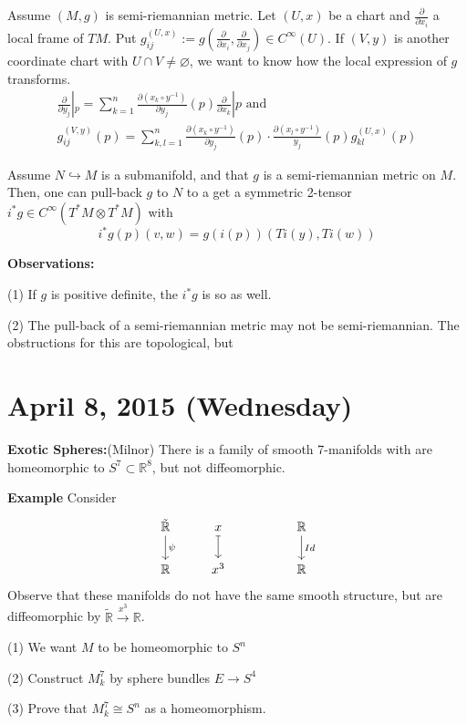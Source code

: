 \documentclass{article}
\begin{document}
Assume $(M,g)$ is semi-riemannian metric. Let $(U,x)$ be a chart and $\frac{\partial}{\partial x_i}$ a local frame of $TM$. Put $g_{ij}^{(U,x)} := g(\frac{\partial}{\partial x_i}, \frac{\partial}{\partial x_j}) \in C^\infty(U)$. If $(V,y)$ is another coordinate chart with $U\cap V \neq \varnothing$, we want to know how the local expression of $g$ transforms.
\begin{align*}
\frac{\partial}{\partial y_j}|_p = \sum_{k=1}^n \frac{\partial (x_k \circ y^{-1})}{\partial y_j}(p) \frac{\partial}{\partial x_k}|p \text{ and } \\
g_{ij}^{(V,y)}(p) = \sum_{k,l=1}^n \frac{\partial (x_k \circ y^{-1})}{\partial y_j}(p) \cdot \frac{\partial (x_l \circ y^{-1})}{y_j}(p)g_{kl}^{(U,x)}(p) 
\end{align*}

Assume $N \hookrightarrow M$ is a submanifold, and that $g$ is a semi-riemannian metric on $M$. Then, one can pull-back $g$ to $N$ to a get a symmetric 2-tensor $i^*g \in C^\infty(T^*M \otimes T^*M)$ with
\[
i^*g(p)(v,w) = g(i(p))(Ti(y), Ti(w))
\]

\textbf{Observations:}

(1) If $g$ is positive definite, the $i^*g$ is so as well.

(2) The pull-back of a semi-riemannian metric may not be semi-riemannian. The obstructions for this are topological, but 

\section{April 8, 2015 (Wednesday)}
\textbf{Exotic Spheres:}(Milnor) There is a family of smooth 7-manifolds with are homeomorphic to $S^7 \subset \mathbb{R}^8$, but not diffeomorphic.

\textbf{Example} Consider
\[
\begin{tikzcd}
\tilde{\mathbb{R}} \arrow[d, "\psi"] & x \arrow[d, mapsto] & & \mathbb{R} \arrow[d, "Id"]\\
\mathbb{R} & x^3 & & \mathbb{R}
\end{tikzcd}
\]
Observe that these manifolds do not have the same smooth structure, but are diffeomorphic by $\tilde{\mathbb{R}} \xrightarrow{x^{3}} \mathbb{R}$.

(1) We want $M$ to be homeomorphic to $S^n$

(2) Construct $M^7_k$ by sphere bundles $E \to S^4$

(3) Prove that $M^7_k \cong S^n$ as a homeomorphism.
\end{document}
